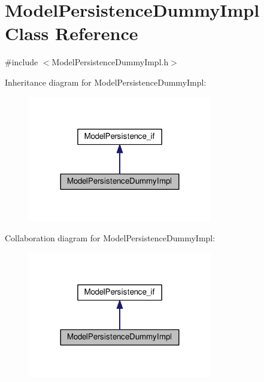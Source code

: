 \hypertarget{class_model_persistence_dummy_impl}{}\section{Model\+Persistence\+Dummy\+Impl Class Reference}
\label{class_model_persistence_dummy_impl}


{\ttfamily \#include $<$Model\+Persistence\+Dummy\+Impl.\+h$>$}



Inheritance diagram for Model\+Persistence\+Dummy\+Impl\+:
\nopagebreak
\begin{figure}[H]
\begin{center}
\leavevmode
\includegraphics[width=228pt]{class_model_persistence_dummy_impl__inherit__graph}
\end{center}
\end{figure}


Collaboration diagram for Model\+Persistence\+Dummy\+Impl\+:
\nopagebreak
\begin{figure}[H]
\begin{center}
\leavevmode
\includegraphics[width=228pt]{class_model_persistence_dummy_impl__coll__graph}
\end{center}
\end{figure}
